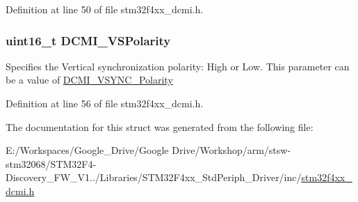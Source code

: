 Definition at line 50 of file stm32f4xx\-\_\-dcmi.\-h.

\hypertarget{struct_d_c_m_i___init_type_def_ad72fd224d329072bd402fbf0b4136ce5}{
\subsubsection[{D\-C\-M\-I\-\_\-\-V\-S\-Polarity}]{\setlength{\rightskip}{0pt plus 5cm}uint16\-\_\-t D\-C\-M\-I\-\_\-\-V\-S\-Polarity}}\label{struct_d_c_m_i___init_type_def_ad72fd224d329072bd402fbf0b4136ce5}
Specifies the Vertical synchronization polarity\-: High or Low. This parameter can be a value of \hyperlink{group___d_c_m_i___v_s_y_n_c___polarity}{D\-C\-M\-I\-\_\-\-V\-S\-Y\-N\-C\-\_\-\-Polarity} 

Definition at line 56 of file stm32f4xx\-\_\-dcmi.\-h.



The documentation for this struct was generated from the following file\-:\begin{DoxyCompactItemize}
\item 
E\-:/\-Workspaces/\-Google\-\_\-\-Drive/\-Google Drive/\-Workshop/arm/stsw-\/stm32068/\-S\-T\-M32\-F4-\/\-Discovery\-\_\-\-F\-W\-\_\-\-V1../\-Libraries/\-S\-T\-M32\-F4xx\-\_\-\-Std\-Periph\-\_\-\-Driver/inc/\hyperlink{stm32f4xx__dcmi_8h}{stm32f4xx\-\_\-dcmi.\-h}\end{DoxyCompactItemize}

